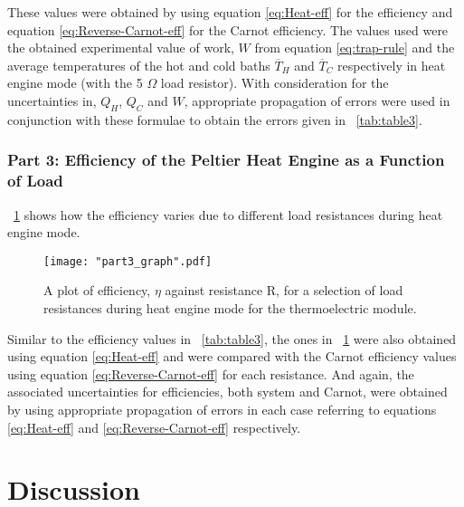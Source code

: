 \documentclass{article}
\newcommand{\figref}[2][\figurename~]{#1\ref{#2}}
\newcommand{\tabref}[2][\tablename~]{#1\ref{#2}}
\begin{document}
\vspace{2mm}
\noindent
These values were obtained by using equation \eqref{eq:Heat-eff} for the efficiency and equation \eqref{eq:Reverse-Carnot-eff} for the Carnot efficiency. The values used were the obtained experimental value of work, $W$ from equation \eqref{eq:trap-rule} and the average temperatures of the hot and cold baths $\overline T_H$ and $\overline T_C$ respectively in heat engine mode (with the 5 $\Omega$ load resistor). With consideration for the uncertainties in, $Q_H$, $Q_C$ and $W$, appropriate propagation of errors were used in conjunction with these formulae to obtain the errors given in \tabref{tab:table3}.

\subsubsection{Part 3: Efficiency of the Peltier Heat Engine as a Function of Load}
\label{sssec:part3_results}

\figref{fig:part3_graph} shows how the efficiency varies due to different load resistances during heat engine mode. 

\begin{figure}[h]
\centering
\texttt{[image: "part3\_graph".pdf]}
\caption{A plot of efficiency, $\eta$ against resistance R, for a selection of load resistances during heat engine mode for the thermoelectric module.}
\label{fig:part3_graph}
\end{figure}

\vspace{2mm}
\noindent
Similar to the efficiency values in \tabref{tab:table3}, the ones in \figref{fig:part3_graph} were also obtained using equation \eqref{eq:Heat-eff} and were compared with the Carnot efficiency values using equation \eqref{eq:Reverse-Carnot-eff} for each resistance. And again, the associated uncertainties for efficiencies, both system and Carnot, were obtained by using appropriate propagation of errors in each case referring to equations \eqref{eq:Heat-eff} and \eqref{eq:Reverse-Carnot-eff} respectively. 

\section{Discussion}
\label{sec:discussion}
\end{document}
